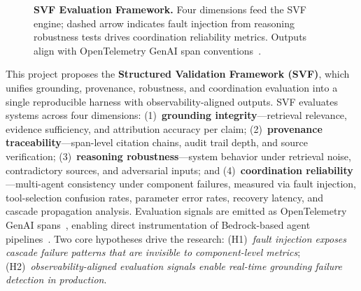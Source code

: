 \documentclass[conference, 10pt]{IEEEtran}
\begin{document}
\begin{figure}[t]
{
    }%
    \caption{\textbf{SVF Evaluation Framework.} Four dimensions feed the SVF engine; dashed arrow indicates fault injection from reasoning robustness tests drives coordination reliability metrics. Outputs align with OpenTelemetry GenAI span conventions~\cite{OpenTelemetryGenAI2024}.}
    \label{fig:framework}
    \vspace{-0.5em}
\end{figure}

This project proposes the \textbf{Structured Validation Framework (SVF)}, which unifies grounding, provenance, robustness, and coordination evaluation into a single reproducible harness with observability-aligned outputs. SVF evaluates systems across four dimensions: (1)~\textbf{grounding integrity}---retrieval relevance, evidence sufficiency, and attribution accuracy per claim; (2)~\textbf{provenance traceability}---span-level citation chains, audit trail depth, and source verification; (3)~\textbf{reasoning robustness}---system behavior under retrieval noise, contradictory sources, and adversarial inputs; and (4)~\textbf{coordination reliability}---multi-agent consistency under component failures, measured via fault injection, tool-selection confusion rates, parameter error rates, recovery latency, and cascade propagation analysis. Evaluation signals are emitted as OpenTelemetry GenAI spans~\cite{OpenTelemetryGenAI2024}, enabling direct instrumentation of Bedrock-based agent pipelines~\cite{AWSBedrockHybridSearch2024}. Two core hypotheses drive the research: (H1)~\textit{fault injection exposes cascade failure patterns that are invisible to component-level metrics}; (H2)~\textit{observability-aligned evaluation signals enable real-time grounding failure detection in production}.
\end{document}
